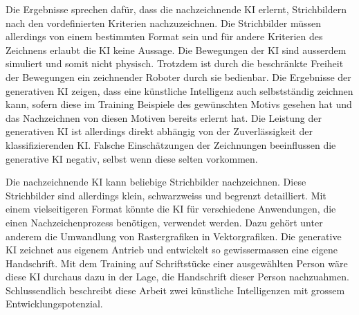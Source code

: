 Die Ergebnisse sprechen dafür, dass die nachzeichnende KI erlernt, Strichbildern
nach den vordefinierten Kriterien nachzuzeichnen. Die Strichbilder müssen
allerdings von einem bestimmten Format sein und für andere Kriterien des
Zeichnens erlaubt die KI keine Aussage. Die Bewegungen der KI sind ausserdem
simuliert und somit nicht physisch. Trotzdem ist durch die beschränkte Freiheit
der Bewegungen ein zeichnender Roboter durch sie bedienbar. Die Ergebnisse der
generativen KI zeigen, dass eine künstliche Intelligenz auch selbstständig
zeichnen kann, sofern diese im Training Beispiele des gewünschten Motivs gesehen
hat und das Nachzeichnen von diesen Motiven bereits erlernt hat. Die Leistung
der generativen KI ist allerdings direkt abhängig von der Zuverlässigkeit der
klassifizierenden KI. Falsche Einschätzungen der Zeichnungen beeinflussen die
generative KI negativ, selbst wenn diese selten vorkommen.
 
Die nachzeichnende KI kann beliebige Strichbilder nachzeichnen. Diese
Strichbilder sind allerdings klein, schwarzweiss und begrenzt detailliert.
Mit einem vielseitigeren Format könnte die KI für verschiedene Anwendungen, die
einen Nachzeichenprozess benötigen, verwendet werden. Dazu gehört unter anderem
die Umwandlung von Rastergrafiken in Vektorgrafiken. Die generative KI zeichnet
aus eigenem Antrieb und entwickelt so gewissermassen eine eigene Handschrift.
Mit dem Training auf Schriftstücke einer ausgewählten Person wäre diese KI
durchaus dazu in der Lage, die Handschrift dieser Person nachzuahmen.
Schlussendlich beschreibt diese Arbeit zwei künstliche Intelligenzen mit grossem
Entwicklungspotenzial.